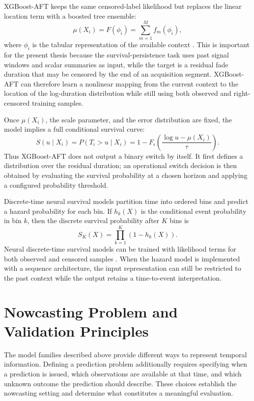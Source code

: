 XGBoost-AFT keeps the same censored-label likelihood but replaces the linear
location term with a boosted tree ensemble:
\[
  \mu(X_i) = F(\phi_i) = \sum_{m=1}^{M} f_m(\phi_i),
\]
where \(\phi_i\) is the tabular representation of the available context
\cite{xgboostAftDocs,barnwal2022xgboostAft}. This is important for the present
thesis because the survival-persistence task uses past signal windows and
scalar summaries as input, while the target is a residual fade duration that
may be censored by the end of an acquisition segment. XGBoost-AFT can therefore
learn a nonlinear mapping from the current context to the location of the
log-duration distribution while still using both observed and right-censored
training samples.

Once \(\mu(X_i)\), the scale parameter, and the error distribution are fixed,
the model implies a full conditional survival curve:
\[
  S(u\mid X_i)
  =
  P(T_i>u\mid X_i)
  =
  1 -
  F_{\epsilon}
  \left(
    \frac{\log u - \mu(X_i)}{\tau}
  \right).
\]
Thus XGBoost-AFT does not output a binary switch by itself. It first defines a
distribution over the residual duration; an operational switch decision is then
obtained by evaluating the survival probability at a chosen horizon and applying
a configured probability threshold.

Discrete-time neural survival models partition time into ordered bins and
predict a hazard probability for each bin. If \(h_k(X)\) is the conditional
event probability in bin \(k\), then the discrete survival probability after
\(K\) bins is
\[
  S_K(X)
  =
  \prod_{k=1}^{K} \left(1-h_k(X)\right).
\]
Neural discrete-time survival models can be trained with likelihood terms for
both observed and censored samples \cite{gensheimer2019nnet}. When the hazard
model is implemented with a sequence architecture, the input representation can
still be restricted to the past context while the output retains a
time-to-event interpretation.

\section{Nowcasting Problem and Validation Principles}
\label{sec:background-nowcasting}

The model families described above provide different ways to represent temporal
information. Defining a prediction problem additionally requires specifying
when a prediction is issued, which observations are available at that time, and
which unknown outcome the prediction should describe. These choices establish
the nowcasting setting and determine what constitutes a meaningful evaluation.

